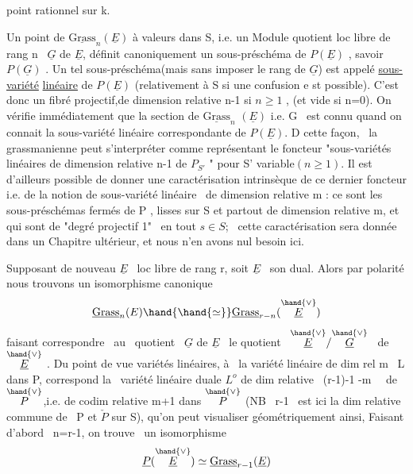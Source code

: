 
point rationnel sur k.

Un point de $\underline{\mathrm{Grass}}_n(\underline{E})$ à valeurs dans S, i.e. un Module quotient
loc libre de rang n \ $\underline{G}$ de $\underline{E}$, définit canoniquement un sous-préschéma
de $P(\underline{E})$ , savoir $P(\underline{G})$ . Un tel sous-préschéma(mais sans imposer le rang de $\underline{G}$) est appelé \uline{sous-variété}
\uline{linéaire} de $P(\underline{E})$ (relativement à S si une confusion e st possible).
C'est donc un fibré projectif,de dimension relative n-1 si $n\geqslant 1$ ,
(et vide si n=0). On vérifie immédiatement que la section de $\underline{\mathrm{Grass}}_n$
$(\underline{E})$ i.e. G \ est connu quand on connait la sous-variété linéaire
correspondante de $P(\underline{E})$. D cette façon, \ la grassmanienne peut
s'interpréter comme représentant le foncteur "sous-variétés linéaires
de dimension relative n-1  de $P_{S'}$ " pour S'
variable$(n\geqslant 1)$. Il est d'ailleurs possible de donner une caractérisation
intrinsèque de ce dernier foncteur i.e. de la notion de sous-variété
linéaire \ de dimension relative m : ce sont les sous-préschémas fermés
de P , lisses sur S et partout de dimension relative m, et qui sont
de "degré projectif 1" \ en tout $s\in S$; \ cette caractérisation sera
donnée dans un Chapitre ultérieur, et nous n'en avons nul besoin ici.

Supposant de nouveau $\underline{E}$ \ loc libre de rang r, soit $\underline{E}$ \ son dual. Alors
par polarité nous trouvons un isomorphisme canonique
\[ \underline{\mathrm{Grass}}_n(E) \hand{\hand{\simeq}} \underline{\mathrm{Grass}}_{r-n}(\overset{\hand{\vee}}{\underline{E}}) \]
faisant correspondre \ au \ quotient \ $\underline{G}$ de $\underline{E}$ \ le quotient \ $\overset{\hand{\vee}}{\underline{E}}/\overset{\hand{\vee}}{\underline{G}}$ \ de $\overset{\hand{\vee}}{\underline{E}}$ .
Du point de vue variétés linéaires, à \ la variété linéaire de dim rel
m \ L dans P, correspond la \ variété linéaire duale $L^{o}$ de dim relative
 \ (r-1)-1 -m \ \ de $\overset{\hand{\vee}}{P}$,i.e. de codim relative m+1 dans $\overset{\hand{\vee}}{P}$ (NB \ r-1 \ est ici la dim relative
commune de \ P et $\check{P}$ sur S), qu'on peut visualiser géométriquement ainsi,
Faisant d'abord \ n=r-1, on trouve \ un isomorphisme
\[ \underline{P}(\overset{\hand{\vee}}{\underline{E}}) \simeq \underline{\mathrm{Grass}}_{r-1}(\underline{E}) \]

